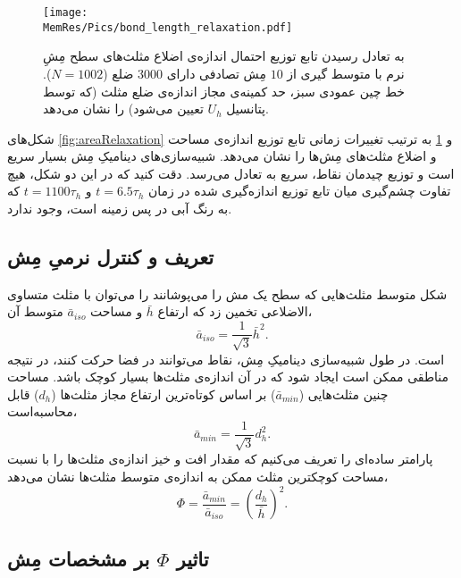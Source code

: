 \begin{figure}[htbp]
\begin{center}
\texttt{[image: \\MemRes/Pics/bond\_length\_relaxation.pdf]}
\caption{
به تعادل رسیدن تابع توزیع احتمال اندازه‌ی اضلاع مثلث‌های سطح مِشِ نرم با متوسط گیری از 
$10$
 مِش‌ تصادفی دارای
$3000$
ضلع 
($N=1002$). خط چین عمودی سبز، حد کمینه‌ی مجاز اندازه‌ی ضلع مثلث (که توسط پتانسیل
$U_h$
تعیین می‌شود) را نشان می‌دهد.
}
\label{fig:bondRelaxation}
\end{center}
\end{figure}

شکل‌های 
\ref{fig:areaRelaxation}
و
\ref{fig:bondRelaxation}
به ترتیب تغییرات زمانی تابع توزیع اندازه‌ی مساحت و اضلاع مثلث‌های مِش‌ها را نشان می‌دهد. شبیه‌سازی‌های دینامیکِ مِش بسیار سریع است و توزیع چیدمان نقاط، سریع به تعادل می‌رسد. دقت کنید که در این دو شکل، هیچ تفاوت چشم‌گیری میان تابع توزیع اندازه‌گیری شده در زمان
$t=6.5 \tau_h$
و
$t=1100 \tau_h$
که به رنگ آبی در پس زمینه است، وجود ندارد.

\subsection{\label{sec:phi}
تعریف و کنترل نرمیِ مِش
}

شکل متوسط مثلث‌هایی که سطح یک مش را می‌پوشانند را می‌توان با مثلث متساوی الاضلاعی تخمین زد که ارتفاع 
$\bar h$
و مساحت 
$\bar a_{iso}$
متوسط آن،
\begin{equation}
\bar a_{iso}=\frac{1}{\sqrt{3}}\bar h^2.
\label{eq:averageTriArea}
\end{equation}
است. در طول شبیه‌سازی دینامیکِ مِش، نقاط می‌توانند در فضا حرکت کنند، در نتیجه مناطقی ممکن است ایجاد شود که در آن اندازه‌ی مثلث‌ها بسیار کوچک باشد. مساحت چنین مثلث‌هایی 
($\bar a_{min}$)
بر اساس کوتاه‌ترین ارتفاع مجاز مثلث‌ها
($d_h$)
قابل محاسبه‌است،
\begin{equation}
\bar a_{min}=\frac{1}{\sqrt{3}}d_h^2.
\label{eq:aMin}
\end{equation}
پارامتر ساده‌ای را تعریف می‌کنیم که مقدار افت و خیز اندازه‌ی مثلث‌ها را با نسبت مساحت کوچکترین مثلث ممکن به اندازه‌ی متوسط مثلث‌ها نشان می‌دهد،
\begin{equation}\label{eq:Phi}
\Phi=\frac{\bar a_{min}}{\bar a_{iso}}=\left(\frac{d_h}{\bar h}\right)^2.
\end{equation}
\subsection{\label{sec:AreaVertex}
تاثیر
$\Phi$
بر مشخصات مِش
}

